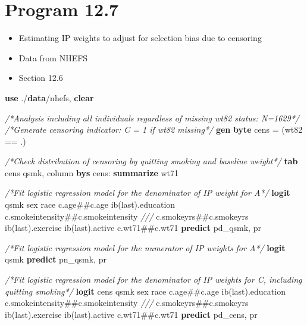 \documentclass[
  10pt,
]{book}
\newenvironment{Shaded}{\begin{snugshade}}{\end{snugshade}}
\newcommand{\CommentTok}[1]{\textcolor[rgb]{0.56,0.35,0.01}{\textit{#1}}}
\newcommand{\FunctionTok}[1]{\textcolor[rgb]{0.00,0.00,0.00}{#1}}
\newcommand{\KeywordTok}[1]{\textcolor[rgb]{0.13,0.29,0.53}{\textbf{#1}}}
\newcommand{\NormalTok}[1]{#1}
\providecommand{\tightlist}{%
  \setlength{\itemsep}{0pt}\setlength{\parskip}{0pt}}
\begin{document}
\hypertarget{program-12.7-1}{%
\section{Program 12.7}\label{program-12.7-1}}

\begin{itemize}
\tightlist
\item
  Estimating IP weights to adjust for selection bias due to censoring
\item
  Data from NHEFS
\item
  Section 12.6
\end{itemize}

\begin{Shaded}
\begin{Highlighting}[]
\KeywordTok{use}\NormalTok{ ./}\KeywordTok{data}\NormalTok{/nhefs, }\KeywordTok{clear}

\CommentTok{/*Analysis including all individuals regardless of missing wt82 status: N=1629*/}
\CommentTok{/*Generate censoring indicator: C = 1 if wt82 missing*/}
\KeywordTok{gen} \KeywordTok{byte}\NormalTok{ cens = (wt82 == .)}

\CommentTok{/*Check distribution of censoring by quitting smoking and baseline weight*/}
\KeywordTok{tab}\NormalTok{ cens qsmk, column}
\KeywordTok{bys}\NormalTok{ cens: }\KeywordTok{summarize}\NormalTok{ wt71}

\CommentTok{/*Fit logistic regression model for the  denominator of IP weight for A*/}
\KeywordTok{logit}\NormalTok{ qsmk sex race c.age\#\#c.age ib(}\FunctionTok{last}\NormalTok{).education c.smokeintensity\#\#c.smokeintensity }\CommentTok{///}
\NormalTok{c.smokeyrs\#\#c.smokeyrs ib(}\FunctionTok{last}\NormalTok{).exercise ib(}\FunctionTok{last}\NormalTok{).active c.wt71\#\#c.wt71 }
\KeywordTok{predict}\NormalTok{ pd\_qsmk, pr}

\CommentTok{/*Fit logistic regression model for the  numerator of IP weights for A*/}
\KeywordTok{logit}\NormalTok{ qsmk}
\KeywordTok{predict}\NormalTok{ pn\_qsmk, pr}

\CommentTok{/*Fit logistic regression model for the  denominator of IP weights for C, including quitting smoking*/}
\KeywordTok{logit}\NormalTok{ cens qsmk sex race c.age\#\#c.age ib(}\FunctionTok{last}\NormalTok{).education c.smokeintensity\#\#c.smokeintensity }\CommentTok{///}
\NormalTok{c.smokeyrs\#\#c.smokeyrs ib(}\FunctionTok{last}\NormalTok{).exercise ib(}\FunctionTok{last}\NormalTok{).active c.wt71\#\#c.wt71 }
\KeywordTok{predict}\NormalTok{ pd\_cens, pr}


\end{Highlighting}
\end{Shaded}
\end{document}
